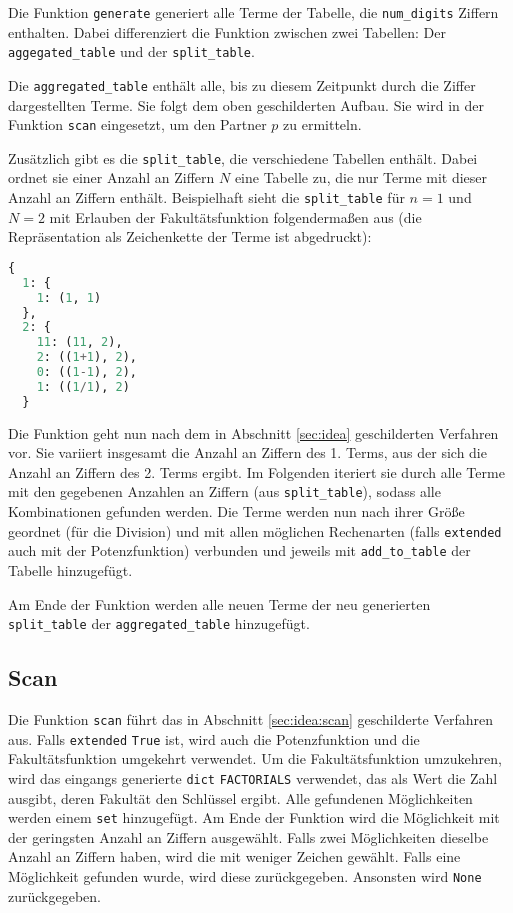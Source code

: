\documentclass[a4paper,10pt,ngerman]{scrartcl}
\begin{document}
Die Funktion \texttt{generate} generiert alle Terme der Tabelle, die \texttt{num\_digits} Ziffern enthalten.
Dabei differenziert die Funktion zwischen zwei Tabellen: Der \texttt{aggegated\_table} und der \texttt{split\_table}.

Die \texttt{aggregated\_table} enthält alle, bis zu diesem Zeitpunkt durch die Ziffer dargestellten Terme.
Sie folgt dem oben geschilderten Aufbau.
Sie wird in der Funktion \texttt{scan} eingesetzt, um den Partner $p$ zu ermitteln.

Zusätzlich gibt es die \texttt{split\_table}, die verschiedene Tabellen enthält.
Dabei ordnet sie einer Anzahl an Ziffern $N$ eine Tabelle zu, die nur Terme mit dieser Anzahl an Ziffern enthält.
Beispielhaft sieht die \texttt{split\_table} für $n=1$ und $N=2$ mit Erlauben der Fakultätsfunktion folgendermaßen aus (die Repräsentation als Zeichenkette der Terme ist abgedruckt):
\begin{lstlisting}[language=Python]
{
  1: {
    1: (1, 1)
  }, 
  2: {
    11: (11, 2),
    2: ((1+1), 2),
    0: ((1-1), 2),
    1: ((1/1), 2)
  }
\end{lstlisting}

Die Funktion geht nun nach dem in Abschnitt \ref{sec:idea} geschilderten Verfahren vor.
Sie variiert insgesamt die Anzahl an Ziffern des 1. Terms, aus der sich die Anzahl an Ziffern des 2. Terms ergibt.
Im Folgenden iteriert sie durch alle Terme mit den gegebenen Anzahlen an Ziffern (aus \texttt{split\_table}), sodass alle Kombinationen gefunden werden.
Die Terme werden nun nach ihrer Größe geordnet (für die Division) und mit allen möglichen Rechenarten (falls \texttt{extended} auch mit der Potenzfunktion) verbunden und jeweils mit \texttt{add\_to\_table} der Tabelle hinzugefügt.

Am Ende der Funktion werden alle neuen Terme der neu generierten \texttt{split\_table} der \texttt{aggregated\_table} hinzugefügt.


\subsection{Scan}
\label{sec:implementation:scan}
Die Funktion \texttt{scan} führt das in Abschnitt \ref{sec:idea:scan} geschilderte Verfahren aus.
Falls \texttt{extended} \texttt{True} ist, wird auch die Potenzfunktion und die Fakultätsfunktion umgekehrt verwendet.
Um die Fakultätsfunktion umzukehren, wird das eingangs generierte \texttt{dict} \texttt{FACTORIALS} verwendet, das als Wert die Zahl ausgibt, deren Fakultät den Schlüssel ergibt.
Alle gefundenen Möglichkeiten werden einem \texttt{set} hinzugefügt.
Am Ende der Funktion wird die Möglichkeit mit der geringsten Anzahl an Ziffern ausgewählt.
Falls zwei Möglichkeiten dieselbe Anzahl an Ziffern haben, wird die mit weniger Zeichen gewählt.
Falls eine Möglichkeit gefunden wurde, wird diese zurückgegeben.
Ansonsten wird \texttt{None} zurückgegeben.
\end{document}

